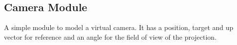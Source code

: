 \subsection{Camera Module}
A simple module to model a virtual camera. It has a position, target and up
vector for reference and an angle for the field of view of the projection.
